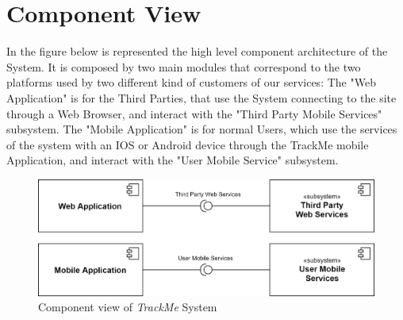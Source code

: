 \section{Component View}
In the figure below is represented the high level component architecture of the System. It is composed by two main modules that correspond to the two platforms used by two different kind of customers of our services: 
The "Web Application" is for the Third Parties, that use the System connecting to the site through a Web Browser, and interact with the "Third Party Mobile Services" subsystem. The "Mobile Application" is for normal Users, which use the services of the system with an IOS or Android device through the TrackMe mobile Application, and interact with the "User Mobile Service" subsystem.
\newline
\newline
\newline

\begin{figure}[H]
    \centering
    \includegraphics[scale=0.25]{./Pictures/component.png}
    \caption{Component view of \emph{TrackMe} System}
\end{figure}

